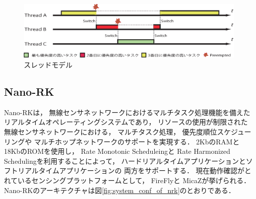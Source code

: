 \begin{figure}[htbp]
 \begin{center}
  \includegraphics[width=140mm]{./images/threads_model.eps}
 \end{center}
 \caption{スレッドモデル}
 \label{fig:threads_model}
\end{figure}



\subsection{Nano-RK}
Nano-RK\cite{Eswaran:2005:NER:1106608.1106672}は，
無線センサネットワークにおけるマルチタスク処理機能を備えた
リアルタイムオペレーティングシステムであり，
リソースの使用が制限された無線センサネットワークにおける，
マルチタスク処理，
優先度順位スケジューリングや
マルチホップネットワークのサポートを実現する．
2KbのRAMと18KbのROMを使用し，
Rate Monotonic Scheduleingと
Rate Harmonized Scheduling\cite{Rowe:2008:RSS:1475690.1475895}を利用することによって，
ハードリアルタイムアプリケーションとソフトリアルタイムアプリケーションの
両方をサポートする．
現在動作確認がとれているセンシングプラットフォームとして，
FireFly\cite{Rowe_firefly:a}と
MicaZ\cite{Hill:2002:MWP:623308.624560}が挙げられる．
Nano-RKのアーキテクチャは図\ref{fig:system_conf_of_nrk}のとおりである．

